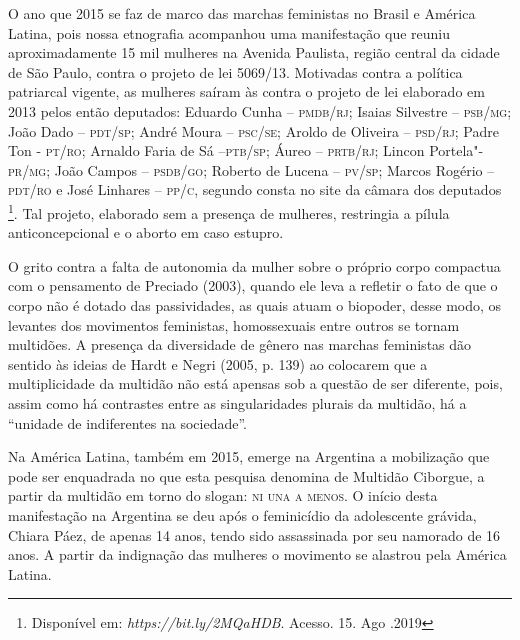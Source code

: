 O ano que 2015 se faz de marco das marchas feministas no Brasil e
América Latina, pois nossa etnografia acompanhou uma manifestação que
reuniu aproximadamente 15 mil mulheres na Avenida Paulista, região
central da cidade de São Paulo, contra o projeto de lei 5069/13.
Motivadas contra a política patriarcal vigente, as mulheres saíram às
contra o projeto de lei elaborado em 2013 pelos então deputados:
Eduardo Cunha --
\textsc{pmdb}/\textsc{rj}; Isaias
Silvestre -- \textsc{psb}/\textsc{mg};
João Dado -- \textsc{pdt}/\textsc{sp};
André Moura -- \textsc{psc}/\textsc{se};
Aroldo de Oliveira -- \textsc{psd}/\textsc{rj};
Padre Ton - \textsc{pt}/\textsc{ro};
Arnaldo Faria de Sá --\textsc{ptb}/\textsc{sp}; Áureo -- \textsc{prtb}/\textsc{rj}; Lincon Portela"-\textsc{pr}/\textsc{mg};
João Campos -- \textsc{psdb}/\textsc{go}; Roberto de Lucena -- \textsc{pv}/\textsc{sp}; Marcos Rogério --
\textsc{pdt}/\textsc{ro} e José Linhares -- \textsc{pp}/\textsc{c}, segundo consta no site da câmara dos
deputados \footnote{Disponível em:
  \emph{https://bit.ly/2MQaHDB}.
  Acesso. 15. Ago .2019}. Tal projeto, elaborado sem a presença de
mulheres, restringia a pílula anticoncepcional e o aborto em caso
estupro.

O grito contra a falta de autonomia da mulher sobre o próprio corpo
compactua com o pensamento de Preciado (2003), quando ele leva a
refletir o fato de que o corpo não é dotado das passividades, as quais
atuam o biopoder, desse modo, os levantes dos movimentos feministas,
homossexuais entre outros se tornam multidões. A presença da diversidade
de gênero nas marchas feministas dão sentido às ideias de Hardt e Negri
(2005, p. 139) ao colocarem que a multiplicidade da multidão não está
apensas sob a questão de ser diferente, pois, assim como há contrastes
entre as singularidades plurais da multidão, há a ``unidade de
indiferentes na sociedade''.

Na América Latina, também em 2015, emerge na Argentina a mobilização que
pode ser enquadrada no que esta pesquisa denomina de Multidão Ciborgue,
a partir da multidão em torno do slogan: \textsc{ni una a menos}. O início desta
manifestação na Argentina se deu após o feminicídio da adolescente
grávida, Chiara Páez, de apenas 14 anos, tendo sido assassinada por seu
namorado de 16 anos. A partir da indignação das mulheres o movimento se
alastrou pela América Latina.

